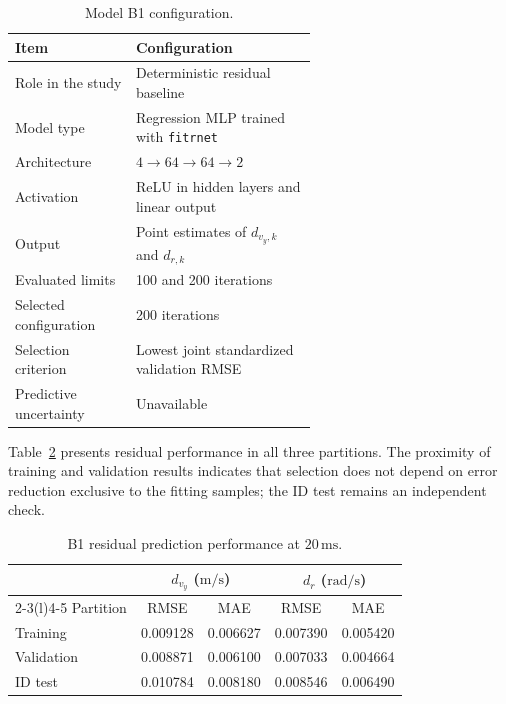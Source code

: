 \documentclass[12pt,a4paper]{report}
\begin{document}
\begin{table}[htbp]
    \centering
    \caption{Model B1 configuration.}
    \label{tab:b1_configuration}
    \begin{tabular}{@{}lp{0.60\linewidth}@{}}
        \toprule
        Item & Configuration \\
        \midrule
        Role in the study
            & Deterministic residual baseline \\
        Model type
            & Regression MLP trained with \texttt{fitrnet} \\
        Architecture
            & $4 \rightarrow 64 \rightarrow 64 \rightarrow 2$ \\
        Activation
            & ReLU in hidden layers and linear output \\
        Output
            & Point estimates of $d_{v_y,k}$ and $d_{r,k}$ \\
        Evaluated limits
            & 100 and 200 iterations \\
        Selected configuration
            & 200 iterations \\
        Selection criterion
            & Lowest joint standardized validation RMSE \\
        Predictive uncertainty
            & Unavailable \\
        \bottomrule
    \end{tabular}
\end{table}

Table~\ref{tab:b1_residual_performance} presents residual performance in all three partitions. The proximity of training and validation results indicates that selection does not depend on error reduction exclusive to the fitting samples; the ID test remains an independent check.

\begin{table}[htbp]
    \centering
    \caption{B1 residual prediction performance at $20\,\mathrm{ms}$.}
    \label{tab:b1_residual_performance}
    \begin{tabular}{@{}lcccc@{}}
        \toprule
        & \multicolumn{2}{c}{$d_{v_y}$ ($\mathrm{m/s}$)}
        & \multicolumn{2}{c}{$d_r$ ($\mathrm{rad/s}$)} \\
        \cmidrule(lr){2-3}\cmidrule(l){4-5}
        Partition & RMSE & MAE & RMSE & MAE \\
        \midrule
        Training & 0.009128 & 0.006627 & 0.007390 & 0.005420 \\
        Validation     & 0.008871 & 0.006100 & 0.007033 & 0.004664 \\
        ID test      & 0.010784 & 0.008180 & 0.008546 & 0.006490 \\
        \bottomrule
    \end{tabular}
\end{table}
\end{document}

